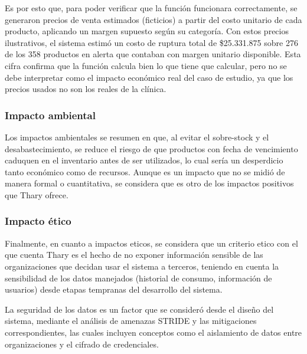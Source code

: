 Es por esto que, para poder verificar que la función funcionara correctamente, se generaron precios de venta estimados (ficticios) a partir del costo unitario de cada producto, aplicando un margen supuesto según su categoría. Con estos precios ilustrativos, el sistema estimó un costo de ruptura total de \$25.331.875 sobre 276 de los 358 productos en alerta que contaban con margen unitario disponible. Esta cifra confirma que la función calcula bien lo que tiene que calcular, pero no se debe interpretar como el impacto económico real del caso de estudio, ya que los precios usados no son los reales de la clínica.

\subsubsection{Impacto ambiental}

Los impactos ambientales se resumen en que, al evitar el sobre-stock y el desabastecimiento, se reduce el riesgo de que productos con fecha de vencimiento caduquen en el inventario antes de ser utilizados, lo cual sería un desperdicio tanto económico como de recursos. Aunque es un impacto que no se midió de manera formal o cuantitativa, se considera que es otro de los impactos positivos que Thary ofrece.

\subsubsection{Impacto ético}

Finalmente, en cuanto a impactos eticos, se considera que un criterio etico con el que cuenta Thary es el hecho de no exponer información sensible de las organizaciones que decidan usar el sistema a terceros, teniendo en cuenta la sensibilidad de los datos manejados (historial de consumo, información de usuarios) desde etapas tempranas del desarrollo del sistema.

La seguridad de los datos es un factor que se consideró desde el diseño del sistema, mediante el análisis de amenazas STRIDE y las mitigaciones correspondientes, las cuales incluyen conceptos como el aislamiento de datos entre organizaciones y el cifrado de credenciales.

